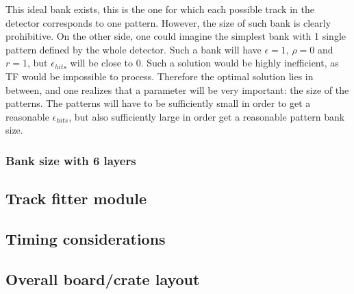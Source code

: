 \noindent This ideal bank exists, this is the one for which each possible track in the detector corresponds to one pattern. However, the size of such bank is clearly prohibitive. On the other side, one could imagine the simplest bank with 1 single pattern defined by the whole detector. Such a bank will have $\epsilon=1$, $\rho = 0$ and $r = 1$, but $\epsilon_{hits}$ will be close to 0. Such a solution would be highly inefficient, as TF would be impossible to process. Therefore the optimal solution lies in between, and one realizes that a parameter will be very important: the size of the patterns. The patterns will have to be sufficiently small in order to get a reasonable $\epsilon_{hits}$, but also sufficiently large in order get a reasonable pattern bank size. 

\subsubsection{Bank size with 6 layers}

\subsection{Track fitter module}

\subsection{Timing considerations}

\subsection{Overall board/crate layout}


\clearpage
